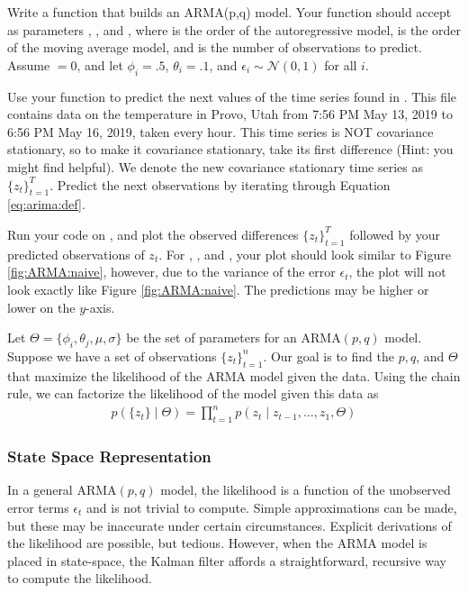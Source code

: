 \begin{problem}
Write a function  that builds an ARMA(p,q) model. 
Your function should accept as parameters , , and , where  is the order of the autoregressive model,  is the order of the moving average model, and  is the number of observations to predict.
Assume $ = 0$, and let $\phi_i=.5$, $\theta_i=.1$, and $\epsilon_i\sim\mathscr{N}(0,1)$ for all $i$.

Use your function to predict the next  values of the time series found in .
This file contains data on the temperature in Provo, Utah from 7:56 PM May 13, 2019 to 6:56 PM May 16, 2019, taken every hour.
This time series is NOT covariance stationary, so to make it covariance stationary, take its first difference (Hint: you might find  helpful).
We denote the new covariance stationary time series as $\{z_t\}_{t=1}^T$.
Predict the next  observations by iterating through Equation \ref{eq:arima:def}.

Run your code on , and plot the observed differences $\{z_t\}_{t=1}^T$ followed by your predicted observations of $z_t$.
For , , and , your plot should look similar to Figure \ref{fig:ARMA:naive}, however, due to the variance of the error $\epsilon_t$, the plot will not look exactly like Figure \ref{fig:ARMA:naive}.
The predictions may be higher or lower on the $y$-axis.
\label{prob:arma:naive}
\end{problem}

Let $\Theta = \{\phi_i, \theta_j, \mu, \sigma\}$ be the set of parameters
for an $\text{ARMA}(p,q)$ model.
Suppose we have a set of observations $\{z_t\}_{t=1}^n$.
Our goal is to find the $p,q$, and $\Theta$ that maximize the likelihood of the ARMA model given the data.
Using the chain rule, we can factorize the likelihood of the model given this data as
\begin{align}
    \label{eq:arma:factorized}
    p(\{z_t\} \mid \Theta) = \prod_{t=1}^{n} p(z_t \mid z_{t-1}, \ldots, z_{1},
    \Theta)
\end{align}

\subsubsection*{State Space Representation}

In a general $\text{ARMA}(p,q)$ model, the likelihood is a function of the
unobserved error terms $\epsilon_t$ and is not trivial to compute.
Simple approximations can be made, but these may be inaccurate under certain
circumstances.
Explicit derivations of the likelihood are possible, but
tedious.
However, when the $\text{ARMA}$ model is placed in state-space, the
Kalman filter affords a straightforward, recursive way to compute the
likelihood.

